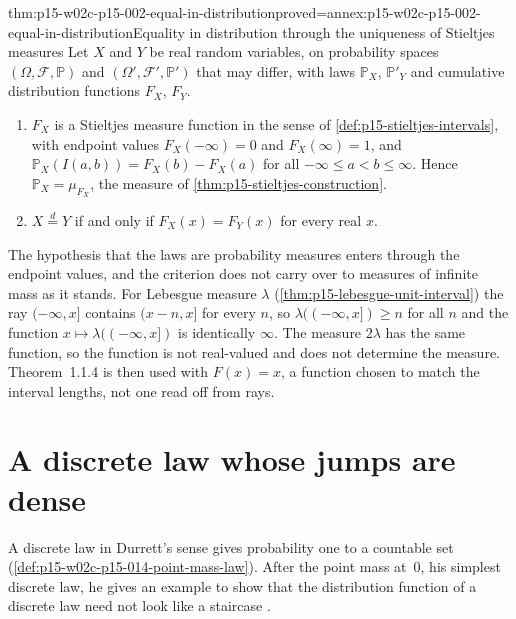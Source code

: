 \begin{hblemma}{thm:p15-w02c-p15-002-equal-in-distribution}{proved=annex:p15-w02c-p15-002-equal-in-distribution}{Equality in distribution through the uniqueness of Stieltjes measures}
Let \(X\) and \(Y\) be real random variables, on probability spaces
\((\Omega,\mathcal F,\mathbb P)\) and \((\Omega',\mathcal F',\mathbb P')\)
that may differ, with laws \(\mathbb P_X\), \(\mathbb P'_Y\) and
cumulative distribution functions \(F_X\), \(F_Y\).
\begin{enumerate}
\item \(F_X\) is a Stieltjes measure function in the sense of
      \cref{def:p15-stieltjes-intervals}, with endpoint values
      \(F_X(-\infty)=0\) and \(F_X(\infty)=1\), and
      \(\mathbb P_X(I(a,b))=F_X(b)-F_X(a)\) for all
      \(-\infty\leq a<b\leq\infty\). Hence \(\mathbb P_X=\mu_{F_X}\), the
      measure of \cref{thm:p15-stieltjes-construction}.
\item \(X\stackrel{d}{=}Y\) if and only if \(F_X(x)=F_Y(x)\) for every
      real \(x\).
\end{enumerate}
\end{hblemma}

The hypothesis that the laws are probability measures enters through
the endpoint values, and the criterion does not carry over to measures
of infinite mass as it stands. For Lebesgue measure \(\lambda\)
(\cref{thm:p15-lebesgue-unit-interval}) the ray \((-\infty,x]\) contains
\((x-n,x]\) for every \(n\), so \(\lambda((-\infty,x])\geq n\) for all
\(n\) and the function \(x\mapsto\lambda((-\infty,x])\) is identically
\(\infty\). The measure \(2\lambda\) has the same function, so the
function is not real-valued and does not determine the measure. Theorem~1.1.4 is then used with \(F(x)=x\), a function
chosen to match the interval lengths, not one read off from rays.

\section{A discrete law whose jumps are dense}
\label{sec:p15-w02c-p15-002-dense-jumps}

A discrete law in Durrett's sense gives probability one to a countable set
(\cref{def:p15-w02c-p15-014-point-mass-law}). After the point mass at~\(0\),
his simplest discrete law, he gives an example to show that the
distribution function of a discrete law need not look like a staircase
\cite[p.~13, Example~1.2.9, p.~14]{DurrettPTEAuthor2019}.

